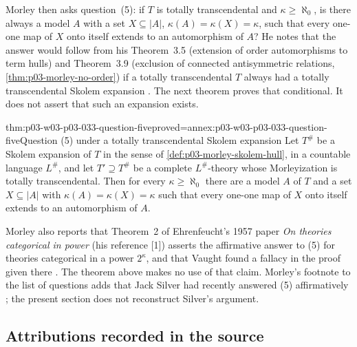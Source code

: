 Morley then asks question~(5): if \(T\) is totally transcendental and
\(\kappa\geq\aleph_0\), is there always a model \(A\) with a set
\(X\subseteq|A|\), \(\kappa(A)=\kappa(X)=\kappa\), such that every one-one
map of \(X\) onto itself extends to an automorphism of \(A\)? He notes that
the answer would follow from his Theorem~3.5 (extension of order
automorphisms to term hulls) and Theorem~3.9 (exclusion of connected
antisymmetric relations,
\cref{thm:p03-morley-no-order}) if a totally transcendental \(T\) always had a totally transcendental
Skolem expansion \cite[p.~537]{Morley1965}. The next theorem proves that
conditional. It does not assert that such an expansion exists.

\begin{hbtheorem}{thm:p03-w03-p03-033-question-five}{proved=annex:p03-w03-p03-033-question-five}{Question (5) under a totally transcendental Skolem expansion}
Let \(T^\#\) be a Skolem expansion of \(T\) in the sense of
\cref{def:p03-morley-skolem-hull}, in a countable language
\(L^\#\), and let \(T'\supseteq T^\#\) be a complete \(L^\#\)-theory whose
Morleyization is totally transcendental. Then for every
\(\kappa\geq\aleph_0\) there are a model \(A\) of \(T\) and a set
\(X\subseteq|A|\) with \(\kappa(A)=\kappa(X)=\kappa\) such that every
one-one map of \(X\) onto itself extends to an automorphism of \(A\).
\end{hbtheorem}

Morley also reports that Theorem~2 of Ehrenfeucht's 1957 paper
\emph{On theories categorical in power} (his reference [1]) asserts the
affirmative answer to (5) for theories categorical in a power
\(2^\kappa\), and that Vaught found a fallacy in the proof given there
\cite[p.~537]{Morley1965}. The theorem above makes no use of that claim.
Morley's footnote to the list of questions adds that Jack Silver had
recently answered (5) affirmatively \cite[p.~537, n.~25]{Morley1965}; the
present section does not reconstruct Silver's argument.

\subsection{Attributions recorded in the source}
\label{sec:p03-w03-p03-033-attributions}

